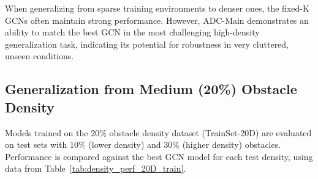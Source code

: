 When generalizing from sparse training environments to denser ones, the fixed-K GCNs often maintain strong performance. However, ADC-Main demonstrates an ability to match the best GCN in the most challenging high-density generalization task, indicating its potential for robustness in very cluttered, unseen conditions.

\subsection{Generalization from Medium (20\%) Obstacle Density}
\label{subsec:gen_medium_density}
Models trained on the 20\% obstacle density dataset (TrainSet-20D) are evaluated on test sets with 10\% (lower density) and 30\% (higher density) obstacles. Performance is compared against the best GCN model for each test density, using data from Table~\ref{tab:density_perf_20D_train}.

